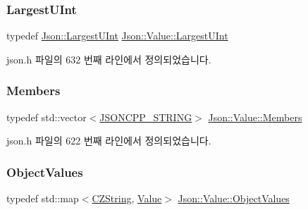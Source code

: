 \mbox{\label{class_json_1_1_value_a6682a3684d635e03fc06ba229fa24eec}} 
\subsubsection{\texorpdfstring{Largest\+U\+Int}{LargestUInt}}
{\footnotesize\ttfamily typedef \hyperlink{namespace_json_ae202ecad69725e23443f465e257456d0}{Json\+::\+Largest\+U\+Int} \hyperlink{class_json_1_1_value_a6682a3684d635e03fc06ba229fa24eec}{Json\+::\+Value\+::\+Largest\+U\+Int}}



json.\+h 파일의 632 번째 라인에서 정의되었습니다.

\mbox{\label{class_json_1_1_value_a9ae9069983fc38f1928d76f9c79ac64d}} 
\subsubsection{\texorpdfstring{Members}{Members}}
{\footnotesize\ttfamily typedef std\+::vector$<$\hyperlink{json_8h_a1e723f95759de062585bc4a8fd3fa4be}{J\+S\+O\+N\+C\+P\+P\+\_\+\+S\+T\+R\+I\+NG}$>$ \hyperlink{class_json_1_1_value_a9ae9069983fc38f1928d76f9c79ac64d}{Json\+::\+Value\+::\+Members}}



json.\+h 파일의 622 번째 라인에서 정의되었습니다.

\mbox{\label{class_json_1_1_value_a08b6c80c3af7071d908dabf044de5388}} 
\subsubsection{\texorpdfstring{Object\+Values}{ObjectValues}}
{\footnotesize\ttfamily typedef std\+::map$<$\hyperlink{class_json_1_1_value_1_1_c_z_string}{C\+Z\+String}, \hyperlink{class_json_1_1_value}{Value}$>$ \hyperlink{class_json_1_1_value_a08b6c80c3af7071d908dabf044de5388}{Json\+::\+Value\+::\+Object\+Values}}



